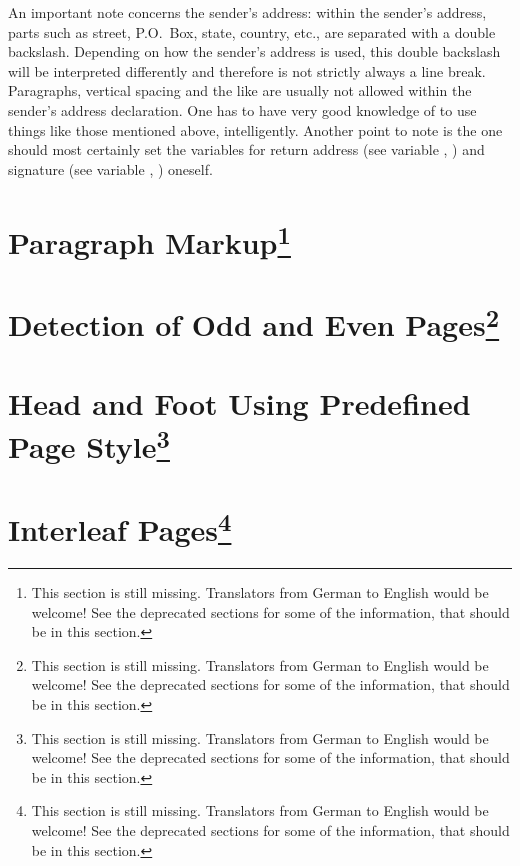 An important note concerns the sender's address: within
the sender's address, parts such as street, P.O.~Box, state, country, etc.,
are separated with a double backslash. Depending on how the sender's address
is used, this double backslash will be interpreted differently and therefore
is not strictly always a line break. Paragraphs, vertical spacing and the like
are usually not allowed within the sender's address declaration. One has to
have very good knowledge of  to use things like those
mentioned above, intelligently. Another point to note is the one should most
certainly set the variables for return address (see variable
, ) and
signature (see variable ,
) oneself.%
%
%
%
%
%
%
%

\section{Paragraph Markup\protect\footnote{This section is still missing. Translators
    from German to English would be welcome! See the deprecated sections for
    some of the information, that should be in this section.}}
\label{sec:scrlttr2.stillmissing}
\mbox{}

\section{Detection of Odd and Even Pages\protect\footnote{This section is still missing. Translators
    from German to English would be welcome! See the deprecated sections for
    some of the information, that should be in this section.}}
\label{sec:scrlttr2.stillmissing}
\mbox{}

\section{Head and Foot Using Predefined Page Style\protect\footnote{This section is still missing. Translators
    from German to English would be welcome! See the deprecated sections for
    some of the information, that should be in this section.}}
\label{sec:scrlttr2.stillmissing}
\mbox{}

\section{Interleaf Pages\protect\footnote{This section is still missing. Translators
    from German to English would be welcome! See the deprecated sections for
    some of the information, that should be in this section.}}
\label{sec:scrlttr2.stillmissing}
\mbox{}

